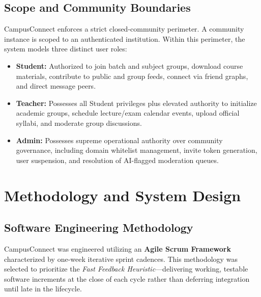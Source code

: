 \documentclass[12pt, a4paper, oneside]{report}
\begin{document}
\section{Scope and Community Boundaries}
CampusConnect enforces a strict closed-community perimeter. A community instance is scoped to an authenticated institution. Within this perimeter, the system models three distinct user roles:
\begin{itemize}[leftmargin=0.7cm]
    \item \textbf{Student:} Authorized to join batch and subject groups, download course materials, contribute to public and group feeds, connect via friend graphs, and direct message peers.
    \item \textbf{Teacher:} Possesses all Student privileges plus elevated authority to initialize academic groups, schedule lecture/exam calendar events, upload official syllabi, and moderate group discussions.
    \item \textbf{Admin:} Possesses supreme operational authority over community governance, including domain whitelist management, invite token generation, user suspension, and resolution of AI-flagged moderation queues.
\end{itemize}

\chapter{Methodology and System Design}

\section{Software Engineering Methodology}
CampusConnect was engineered utilizing an \textbf{Agile Scrum Framework} characterized by one-week iterative sprint cadences. This methodology was selected to prioritize the \textit{Fast Feedback Heuristic}---delivering working, testable software increments at the close of each cycle rather than deferring integration until late in the lifecycle.
\end{document}
